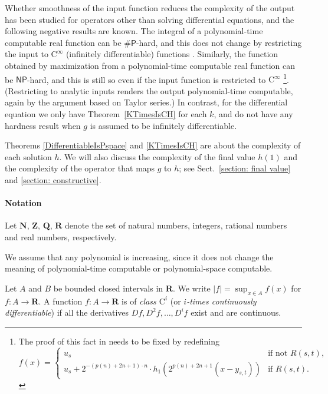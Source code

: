 \documentclass[12pt,a4paper]{article}
\theoremstyle{definition}
\theoremstyle{remark}
\newcommand{\R}{\mathbf R}
\newcommand{\N}{\mathbf N}
\newcommand{\Q}{\mathbf Q}
\newcommand{\Z}{\mathbf Z}
\newcommand{\D}{D}
\newcommand{\classNP}{\mathsf{NP}}
\newcommand{\classNumberP}{\mathsf{\#P}}
\newcommand{\classC}{\mathrm C}
\begin{document}
Whether smoothness of the input function 
reduces the complexity of the output
has been studied for operators other than solving differential equations, 
and the following negative results are known. 
The integral of a polynomial-time computable real function 
can be $\classNumberP$-hard, and this does not change 
by restricting the input to 
$\classC ^\infty$ (infinitely differentiable) functions
\cite[Theorem~5.33]{ko1991complexity}. 
Similarly, the function obtained by maximization 
from a polynomial-time computable real function 
can be $\classNP$-hard, and this is still so
even if the input function is restricted to $\classC ^\infty$ 
\cite[Theorem~3.7]{ko1991complexity}%
\footnote{%
The proof of this fact in \cite[Theorem 3.7]{ko1991complexity}
needs to be fixed by redefining 
\[f(x) = 
\begin{cases}
 u_s & \text{if not } R(s,t), \\
 u_s + 2^{-(p(n)+2n+1)\cdot n} \cdot h_1(2^{p(n)+2n+1} (x - y_{s,t})) & \text{if } R(s,t). 
\end{cases}\]
}. 
(Restricting to analytic inputs 
renders the output polynomial-time computable, 
again by the argument based on Taylor series.)
In contrast, for the differential equation
we only have Theorem~\ref{KTimesIsCH} for each $k$, 
and do not have any hardness result 
when $g$ is assumed to be infinitely differentiable. 

Theorems \ref{DifferentiableIsPspace} and \ref{KTimesIsCH} 
are about the complexity of each solution $h$. 
We will also discuss
the complexity of the final value $h(1)$ and
the complexity of the operator that maps $g$ to $h$; 
see Sect.~\ref{section: final value} and \ref{section: constructive}. 

\paragraph{Notation}
Let $\N$, $\Z$, $\Q$, $\R$ denote the set of natural numbers,
integers,
rational numbers and 
real numbers, respectively.

We assume that any polynomial is increasing,
since it does not change the meaning of 
polynomial-time computable or polynomial-space computable.

Let $A$ and $B$ be bounded closed intervals in $\R$.
We write $|f| = \sup_{x \in A} f(x)$ for $f \colon A \to \R$.
A function $f \colon A \to \R$ is of \emph{class $\classC^i$}
(or \emph{$i$-times continuously differentiable})
if all the derivatives $\D f, \D^2 f, \dots, \D^i f$ exist and are continuous.
\end{document}
